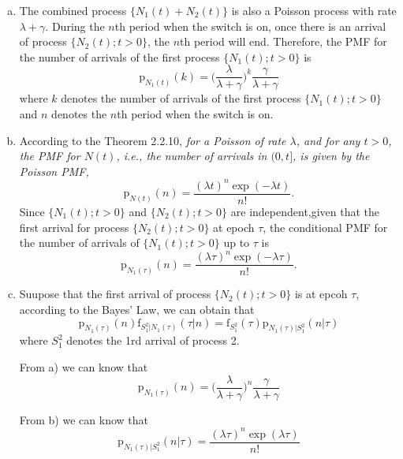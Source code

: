 \documentclass[UTF8]{article}
\begin{document}
    \begin{enumerate}[a)]
        \item The combined process $\{N_1(t)+N_2(t)\}$ is also a Poisson process with rate $\lambda+\gamma$. During the $n$th period when the switch is on, once there is an arrival of process $\{N_2(t);t>0\}$, the $n$th period will end. Therefore, the PMF for the number of arrivals of the first process $\{N_1(t);t>0\}$ is
        \begin{equation*}
            \text{p}_{N_1(t)}(k)=\big(\frac{\lambda}{\lambda+\gamma}\big)^k\frac{\gamma}{\lambda+\gamma}
        \end{equation*}
        where $k$ denotes the number of arrivals of the first process $\{N_1(t);t>0\}$ and $n$ denotes the $n$th period when the switch is on.
        \item According to the Theorem 2.2.10, \textsl{for a Poisson of rate $\lambda$, and for any $t>0$, the PMF for $N(t)$, i.e., the number of arrivals in $(0,t]$, is given by the Poisson PMF,}
        \begin{equation*}
            \text{p}_{N(t)}(n)=\frac{(\lambda t)^n\exp(-\lambda t)}{n!}.
        \end{equation*}
        Since $\{N_1(t);t>0\}$ and $\{N_2(t);t>0\}$ are independent,given that the first arrival for process $\{N_2(t);t>0\}$ at epoch $\tau$, the conditional PMF for the number of arrivals of $\{N_1(t);t>0\}$ up to $\tau$ is
        \begin{equation*}
            \text{p}_{N_1(\tau)}(n)=\frac{(\lambda\tau)^n\exp(-\lambda\tau)}{n!}.
        \end{equation*}
        \item Suupose that the first arrival of process $\{N_2(t);t>0\}$ is at epcoh $\tau$, according to the Bayes' Law, we can obtain that
        \begin{equation*}
            \text{p}_{N_1(\tau)}(n)\text{f}_{S^2_1|N_1(\tau)}(\tau|n)=\text{f}_{S^2_1}(\tau)\text{p}_{N_1(\tau)|S^2_1}(n|\tau)
        \end{equation*}
        where $S^2_1$ denotes the 1rd arrival of process 2. 
        
        From a) we can know that 
        \begin{equation*}
            \text{p}_{N_1(\tau)}(n)=\big(\frac{\lambda}{\lambda+\gamma}\big)^n\frac{\gamma}{\lambda+\gamma}
        \end{equation*}
        
        From b) we can know that
        \begin{equation*}
            \text{p}_{N_1(\tau)|S^2_1}(n|\tau)=\frac{(\lambda\tau)^n\exp(\lambda\tau)}{n!}
        \end{equation*}


\end{enumerate}
\end{document}

